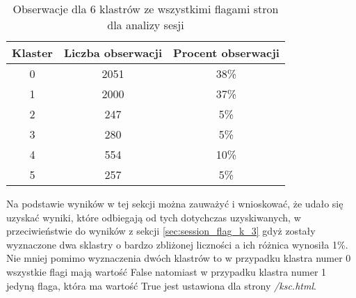 \documentclass[../EDI_Task1_Karwowski_Kowalewski.tex]{subfiles}
\begin{document}
{{{            \begin{table}[!htbp]
                \footnotesize
                \centering
                \begin{tabular}{|c|c|c|}
                    \hline
                    Klaster & Liczba obserwacji & Procent obserwacji \\ \hline
                    0   &   2051 & 38\% \\
                    1   &   2000 & 37\% \\
                    2   &    247 &  5\% \\
                    3   &    280 &  5\% \\
                    4   &    554 & 10\% \\
                    5   &    257 &  5\% \\ \hline
                \end{tabular}
                \caption
                {Obserwacje dla 6 klastrów ze wszystkimi flagami stron dla analizy sesji}
                \label{stats_session_flag_k_6}
            \end{table}
            \FloatBarrier

            Na podstawie wyników w tej sekcji można zauważyć i wnioskować, że
            udało się uzyskać wyniki, które odbiegają od tych dotychczas
            uzyskiwanych, w przeciwieństwie do wyników z sekcji
            \ref{sec:session_flag_k_3} gdyż zostały wyznaczone dwa sklastry o
            bardzo zbliżonej liczności a ich różnica wynosiła 1\%. Nie mniej pomimo
            wyznaczenia dwóch klastrów to w przypadku klastra numer 0 wszystkie
            flagi mają wartość False natomiast w przypadku klastra numer 1 jedyną
            flaga, która ma wartość True jest ustawiona dla strony \textit{/ksc.html}.
        }
    }
}
\end{document}
